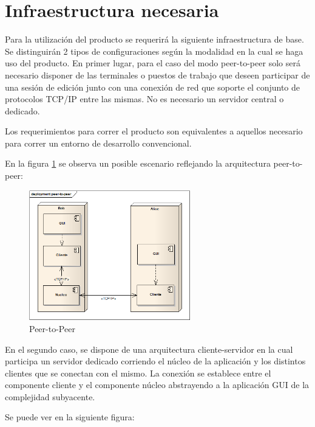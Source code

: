 \documentclass[12pt,a4paper]{article}
\begin{document}
	\section{Infraestructura necesaria}

Para la utilización del producto se requerirá la siguiente infraestructura de base.
Se distinguirán 2 tipos de configuraciones según la modalidad en la cual se haga uso del producto.
En primer lugar, para el caso del modo peer-to-peer solo será necesario disponer de las terminales o puestos de trabajo que deseen participar de una sesión de edición junto con una conexión de red que soporte el conjunto de protocolos TCP/IP entre las mismas. No es necesario un servidor central o dedicado.

Los requerimientos para correr el producto son equivalentes a aquellos necesario para correr un entorno de desarrollo convencional.

En la figura \ref{peer} se observa un posible escenario reflejando la arquitectura peer-to-peer:


	\begin{figure}[!ht]
		\begin{center}
			\includegraphics[width=7cm]{peer-to-peer.png}
			\caption{\label{peer} Peer-to-Peer }
		\end{center}
	\end{figure}



En el segundo caso, se dispone de una arquitectura cliente-servidor en la cual participa un servidor dedicado corriendo el núcleo de la aplicación y los distintos clientes que se conectan con el mismo. La conexión se establece entre el componente cliente y el componente núcleo abstrayendo a la aplicación GUI de la complejidad subyacente.

Se puede ver en la siguiente figura:
\end{document}
